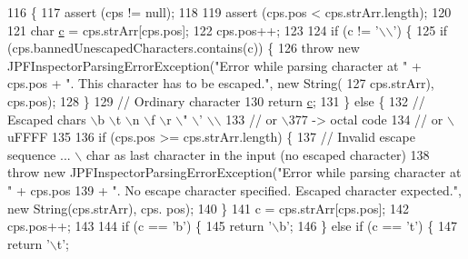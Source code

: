 \begin{DoxyCode}
116                                                                                                            
        \{
117     assert (cps != null);
118 
119     assert (cps.pos < cps.strArr.length);
120 
121     \textcolor{keywordtype}{char} \hyperlink{classgov_1_1nasa_1_1jpf_1_1inspector_1_1server_1_1expression_1_1expressions_1_1_expression_state_value_const_char_afa89583a44a250193efe6cb6ecbff9a0}{c} = cps.strArr[cps.pos];
122     cps.pos++;
123 
124     \textcolor{keywordflow}{if} (c != \textcolor{charliteral}{'\(\backslash\)\(\backslash\)'}) \{
125       \textcolor{keywordflow}{if} (cps.bannedUnescapedCharacters.contains(c)) \{
126         \textcolor{keywordflow}{throw} \textcolor{keyword}{new} JPFInspectorParsingErrorException(\textcolor{stringliteral}{"Error while parsing character at "} + cps.pos + \textcolor{stringliteral}{". This
       character has to be escaped."}, \textcolor{keyword}{new} String(
127             cps.strArr), cps.pos);
128       \}
129       \textcolor{comment}{// Ordinary character}
130       \textcolor{keywordflow}{return} \hyperlink{classgov_1_1nasa_1_1jpf_1_1inspector_1_1server_1_1expression_1_1expressions_1_1_expression_state_value_const_char_afa89583a44a250193efe6cb6ecbff9a0}{c};
131     \} \textcolor{keywordflow}{else} \{
132       \textcolor{comment}{// Escaped chars \(\backslash\)b \(\backslash\)t \(\backslash\)n \(\backslash\)f \(\backslash\)r \(\backslash\)" \(\backslash\)' \(\backslash\)\(\backslash\)}
133 \textcolor{comment}{      // or \(\backslash\)377 -> octal code}
134       \textcolor{comment}{// or \(\backslash\)uFFFF}
135 
136       \textcolor{keywordflow}{if} (cps.pos >= cps.strArr.length) \{
137         \textcolor{comment}{// Invalid escape sequence ... \(\backslash\) char as last character in the input (no escaped character)}
138         \textcolor{keywordflow}{throw} \textcolor{keyword}{new} JPFInspectorParsingErrorException(\textcolor{stringliteral}{"Error while parsing character at "} + cps.pos
139             + \textcolor{stringliteral}{". No escape character specified. Escaped character expected."}, \textcolor{keyword}{new} String(cps.strArr), cps.
      pos);
140       \}
141       c = cps.strArr[cps.pos];
142       cps.pos++;
143 
144       \textcolor{keywordflow}{if} (c == \textcolor{charliteral}{'b'}) \{
145         \textcolor{keywordflow}{return} \textcolor{charliteral}{'\(\backslash\)b'};
146       \} \textcolor{keywordflow}{else} \textcolor{keywordflow}{if} (c == \textcolor{charliteral}{'t'}) \{
147         \textcolor{keywordflow}{return} \textcolor{charliteral}{'\(\backslash\)t'};

\end{DoxyCode}
